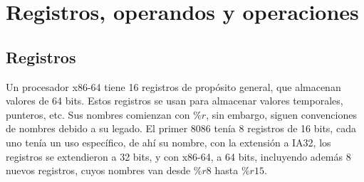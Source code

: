 \section{Registros, operandos y operaciones}
\subsection{Registros}
Un procesador x86-64 tiene 16 registros de propósito general, que almacenan valores de 64 bits.
Estos registros se usan para almacenar valores temporales, punteros, etc. Sus nombres comienzan
con $\%r$, sin embargo, siguen convenciones de nombres debido a su legado. El primer 8086 tenía
8 registros de 16 bits, cada uno tenía un uso específico, de ahí su nombre, con la extensión a
IA32, los registros se extendieron a 32 bits, y con x86-64, a 64 bits, incluyendo además 8
nuevos registros, cuyos nombres van desde $\%r8$ hasta $\%r15$.

\begin{center}
	
\end{center}

